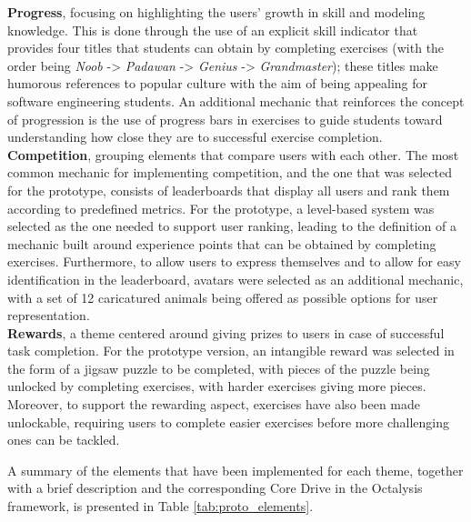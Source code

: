 \textbf{Progress}, focusing on highlighting the users' growth in skill and modeling knowledge. This is done through the use of an explicit skill indicator that provides four titles that students can obtain by completing exercises (with the order being \emph{Noob} -> \emph{Padawan} -> \emph{Genius} -> \emph{Grandmaster}); these titles make humorous references to popular culture with the aim of being appealing for software engineering students. An additional mechanic that reinforces the concept of progression is the use of progress bars in exercises to guide students toward understanding how close they are to successful exercise completion. \\

\textbf{Competition}, grouping elements that compare users with each other. The most common mechanic for implementing competition, and the one that was selected for the prototype, consists of leaderboards that display all users and rank them according to predefined metrics. For the prototype, a level-based system was selected as the one needed to support user ranking, leading to the definition of a mechanic built around experience points that can be obtained by completing exercises. Furthermore, to allow users to express themselves and to allow for easy identification in the leaderboard, avatars were selected as an additional mechanic, with a set of 12 caricatured animals being offered as possible options for user representation.\\

\textbf{Rewards}, a theme centered around giving prizes to users in case of successful task completion. For the prototype version, an intangible reward was selected in the form of a jigsaw puzzle to be completed, with pieces of the puzzle being unlocked by completing exercises, with harder exercises giving more pieces. Moreover, to support the rewarding aspect, exercises have also been made unlockable, requiring users to complete easier exercises before more challenging ones can be tackled.

A summary of the elements that have been implemented for each theme, together with a brief description and the corresponding Core Drive in the Octalysis framework, is presented in Table \ref{tab:proto_elements}. 

